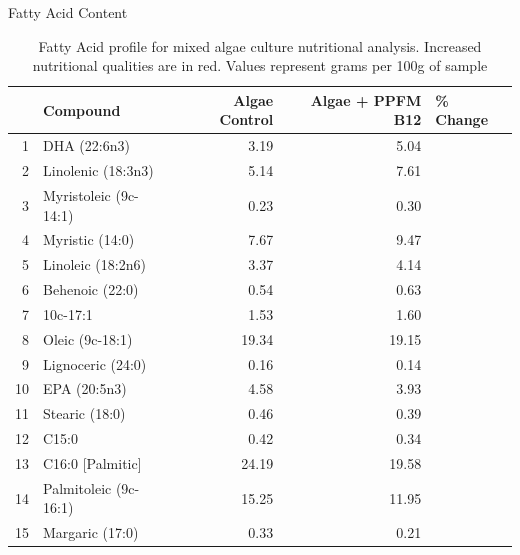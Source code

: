 \documentclass[8pt]{beamer}\usepackage[]{graphicx}\usepackage[]{color}
\begin{document}
\begin{frame}{Fatty Acid Content}
\begin{table}[ht]
\centering
{\small
\begin{tabular}{rlrrl}
  \hline
 & Compound & Algae Control & Algae + PPFM B12 & \% Change \\ 
  \hline
1 & DHA (22:6n3) & 3.19 & 5.04 & \textbf{\color{red}{57.99}} \\ 
  2 & Linolenic (18:3n3) & 5.14 & 7.61 & \textbf{\color{red}{48.05}} \\ 
  3 & Myristoleic (9c-14:1) & 0.23 & 0.30 & \textbf{\color{red}{30.43}} \\ 
  4 & Myristic (14:0) & 7.67 & 9.47 & \textbf{\color{red}{23.47}} \\ 
  5 & Linoleic (18:2n6) & 3.37 & 4.14 & \textbf{\color{red}{22.85}} \\ 
  6 & Behenoic (22:0) & 0.54 & 0.63 & \textbf{\color{red}{16.67}} \\ 
  7 & 10c-17:1 & 1.53 & 1.60 & \textbf{\color{red}{4.58}} \\ 
  8 & Oleic (9c-18:1) & 19.34 & 19.15 & \textbf{\color{blue}{-0.98}} \\ 
  9 & Lignoceric (24:0) & 0.16 & 0.14 & \textbf{\color{blue}{-12.50}} \\ 
  10 & EPA (20:5n3) & 4.58 & 3.93 & \textbf{\color{blue}{-14.19}} \\ 
  11 & Stearic (18:0) & 0.46 & 0.39 & \textbf{\color{blue}{-15.22}} \\ 
  12 & C15:0 & 0.42 & 0.34 & \textbf{\color{blue}{-19.05}} \\ 
  13 & C16:0 [Palmitic] & 24.19 & 19.58 & \textbf{\color{blue}{-19.06}} \\ 
  14 & Palmitoleic (9c-16:1) & 15.25 & 11.95 & \textbf{\color{blue}{-21.64}} \\ 
  15 & Margaric (17:0) & 0.33 & 0.21 & \textbf{\color{blue}{-36.36}} \\ 
   \hline
\end{tabular}
}
\caption{Fatty Acid profile for mixed algae culture nutritional analysis. Increased nutritional qualities are in red. Values represent grams per 100g of sample} 
\label{tab:FattyAcids_trim}
\end{table}

\end{frame}
%
\end{document}
